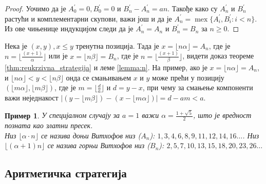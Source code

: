 \documentclass[a4paper]{article}
\newtheorem{example}{Пример}
\DeclareMathOperator{\mex}{mex}
\begin{document}
\begin{proof}
	Уочимо да је $ A^{'}_{0} = 0, B^{'}_{0} = 0 $ и $ B^{'}_{n} - A^{'}_{n} = an $. Такође како су $ A^{'}_{n} $ и $ B^{'}_{n} $ растући и комплементарни скупови, важи још и да је $ A^{'}_{n} = \mex \{ A^{'}_{i}, B^{'}_{i} : i < n \} $. Из ове чињенице индукцијом следи да је $ A^{'}_{n} = A_{n} $ и $ B^{'}_{n} = B_{n}  $ за $ n \ge 0 $.
\end{proof}

Нека је $ (x, y), x \leq y $ тренутна позиција. Тада је $ x = \lfloor n \alpha \rfloor = A_{n} $, где је $ n = \lfloor \frac{(x+1)}{\alpha} \rfloor $ или је $ x = \lfloor n \beta \rfloor = B_{n} $, где је $ n = \lfloor \frac{(x+1)}{\beta} \rfloor $, видети доказ теореме \ref{thm:reukrzivna_strategija} и леме \ref{lemma:n}. На пример, ако је $ x = \lfloor n \alpha \rfloor = A_{n} $, и $ \lfloor n \alpha \rfloor < y < \lfloor n \beta \rfloor $ онда се смањивањем $ x $ и $ y $ може прећи у позицију $ (\lfloor m \alpha \rfloor, \lfloor m \beta \rfloor) $, где је $ m = \lfloor \frac{d}{a} \rfloor $ и $ d = y - x $, при чему за смањење компоненти важи неједнакост $ |(y - \lfloor m \beta \rfloor) - (x - \lfloor m \alpha \rfloor)| = d - am < a $.

\begin{example}
	У специјалном случају за $ a = 1 $ важи $ \alpha = \frac{1 + \sqrt{5}}{2} $, што је вредност позната као златни пресек.\\	
	Низ $ \lfloor \alpha \cdot n \rfloor $ се назива доњи Витхофов низ ($ A_{n} $):
	$ 1, 3, 4, 6, 8, 9, 11, 12, 14, 16 \ldots $. Низ $ \lfloor (\alpha + 1) n \rfloor $ се назива горњи Витхофов низ ($ B_{n} $):
	$ 2, 5, 7, 10, 13, 15, 18, 20, 23, 26 \ldots $
\end{example}

\subsection{Аритметичка стратегија}
\end{document}

